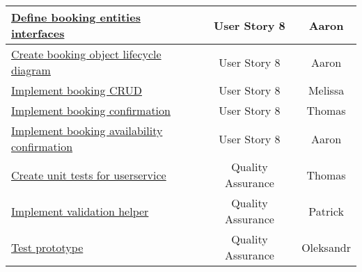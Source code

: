 \begin{table}[h]
\begin{tabular}{|l|c|c|}
        \hline
        \href{https://gitlab.rz.uni-bamberg.de/swt/teaching/2021-ws/swt-swl-b/group-a/-/issues/68}{Define booking entities interfaces} & User Story 8 & Aaron \\
        \hline
        \href{https://gitlab.rz.uni-bamberg.de/swt/teaching/2021-ws/swt-swl-b/group-a/-/issues/82}{Create booking object lifecycle diagram} & User Story 8 & Aaron \\
        \hline
        \href{https://gitlab.rz.uni-bamberg.de/swt/teaching/2021-ws/swt-swl-b/group-a/-/issues/73}{Implement booking CRUD} & User Story 8 & Melissa \\
        \hline
        \href{https://gitlab.rz.uni-bamberg.de/swt/teaching/2021-ws/swt-swl-b/group-a/-/issues/71}{Implement booking confirmation} & User Story 8 & Thomas \\
        \hline
        \href{https://gitlab.rz.uni-bamberg.de/swt/teaching/2021-ws/swt-swl-b/group-a/-/issues/70}{Implement booking availability confirmation} & User Story 8 & Aaron \\
        \hline
        \href{https://gitlab.rz.uni-bamberg.de/swt/teaching/2021-ws/swt-swl-b/group-a/-/issues/72}{Create unit tests for userservice} & Quality Assurance & Thomas \\
        \hline
        \href{https://gitlab.rz.uni-bamberg.de/swt/teaching/2021-ws/swt-swl-b/group-a/-/issues/62}{Implement validation helper} & Quality Assurance  & Patrick \\
        \hline
        \href{https://gitlab.rz.uni-bamberg.de/swt/teaching/2021-ws/swt-swl-b/group-a/-/issues/81}{Test prototype} & Quality Assurance  & Oleksandr \\
        \hline
    \end{tabular}
\end{table}